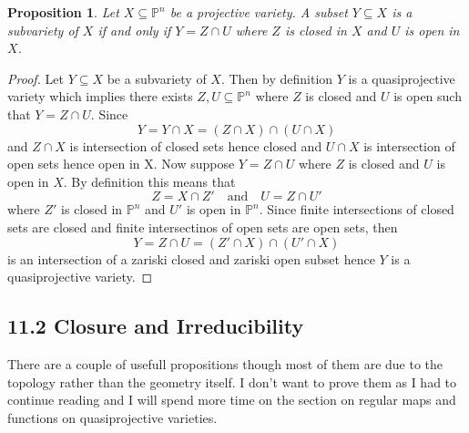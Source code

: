 \documentclass[40pt]{article}
\newcommand{\Proj}{\mathbb{P}}
\newtheorem{proposition}{Proposition}[section]
\theoremstyle{remark}
\begin{document}
				\begin{proposition}
					Let $X \subseteq\Proj^n$ be a projective variety. A subset $Y \subseteq X$ is a subvariety of $X$ if and only if $Y = Z \cap U$ where $Z$ is closed in $X$ and $U$ is open in $X$. 
				\end{proposition}
				\begin{proof}
					Let $Y \subseteq X$ be a subvariety of $X$. Then by definition $Y$ is a quasiprojective variety which implies there exists $Z , U \subseteq \Proj^n$ where $Z$ is closed and $U$ is open such that $Y = Z \cap U$. Since 
					\[
					Y = Y \cap X  = (Z \cap X) \cap (U \cap X)
					\]
					and $Z \cap X$ is intersection of closed sets hence closed and $U \cap X$ is intersection of open sets hence open in X. Now suppose $Y = Z \cap U$ where $Z$ is closed and $U$ is open in $X$. By definition this means that 
					\[
					Z = X \cap Z' \quad\text{and}\quad U = Z \cap U'
					\]
					where $Z'$ is closed in $\Proj^n$ and $U'$ is open in $\Proj^n$. Since finite intersections of closed sets are closed and finite intersectinos of open sets are open sets, then 
					\[
					Y = Z \cap U = (Z' \cap X) \cap (U' \cap X)
					\]
					is an intersection of a zariski closed and zariski open subset hence $Y$ is a quasiprojective variety. 
				\end{proof}
				\subsection{11.2 Closure and Irreducibility}
				There are a couple of usefull propositions though most of them are due to the topology rather than the geometry itself. I don't want to prove them as I had to continue reading and I will spend more time on the section on regular maps and functions on quasiprojective varieties. 
\end{document}

